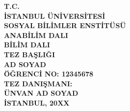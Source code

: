 \begin{titlepage}
\begin{center}
    {\fontsize{14pt}{16pt}\selectfont\textbf{T.C.}} \\
    {\fontsize{14pt}{16pt}\selectfont\textbf{İSTANBUL ÜNİVERSİTESİ}} \\
    {\fontsize{14pt}{16pt}\selectfont\textbf{SOSYAL BİLİMLER ENSTİTÜSÜ}} \\
    \vspace{2cm}
    {\fontsize{14pt}{16pt}\selectfont\textbf{ANABİLİM DALI}} \\
    {\fontsize{14pt}{16pt}\selectfont\textbf{BİLİM DALI}} \\
    \vspace{2cm}
    {\fontsize{14pt}{16pt}\selectfont\textbf{TEZ BAŞLIĞI}} \\
    \vspace{2cm}
    {\fontsize{14pt}{16pt}\selectfont\textbf{AD SOYAD}} \\
    {\fontsize{14pt}{16pt}\selectfont\textbf{ÖĞRENCİ NO: 12345678}} \\
    \vfill
    {\fontsize{14pt}{16pt}\selectfont\textbf{TEZ DANIŞMANI:}} \\
    {\fontsize{14pt}{16pt}\selectfont\textbf{ÜNVAN AD SOYAD}} \\
    \vspace{1cm}
    {\fontsize{14pt}{16pt}\selectfont\textbf{İSTANBUL, 20XX}}
\end{center}
\end{titlepage}
